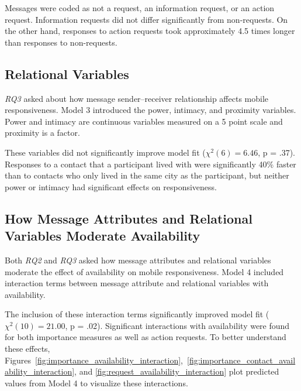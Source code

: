 \documentclass[12pt]{nuthesis}	%
\begin{document}
Messages were coded as not a request, an information request, or an action request. Information requests did not differ significantly from non-requests. On the other hand, responses to action requests took approximately 4.5 times longer than responses to non-requests.


\subsection{Relational Variables}

\textit{RQ3} asked about how message sender--receiver relationship affects mobile responsiveness. Model 3 introduced the power, intimacy, and proximity variables. Power and intimacy are continuous variables measured on a 5 point scale and proximity is a factor.

These variables did not significantly improve model fit ($\chi^2(6) = 6.46$, p = .37). Responses to a contact that a participant lived with were significantly 40\% faster than to contacts who only lived in the same city as the participant, but neither power or intimacy had significant effects on responsiveness.

\subsection{How Message Attributes and Relational Variables Moderate Availability}

Both \textit{RQ2} and \textit{RQ3} asked how message attributes and relational variables moderate the effect of availability on mobile responsiveness. Model 4 included interaction terms between message attribute and relational variables with availability.

The inclusion of these interaction terms significantly improved model fit ($\chi^2(10) = 21.00$, p = .02). Significant interactions with availability were found for both importance measures as well as action requests. To better understand these effects, Figures~\ref{fig:importance_availability_interaction},~\ref{fig:importance_contact_availability_interaction}, and \ref{fig:request_availability_interaction} plot predicted values from Model 4 to visualize these interactions.
\end{document}
